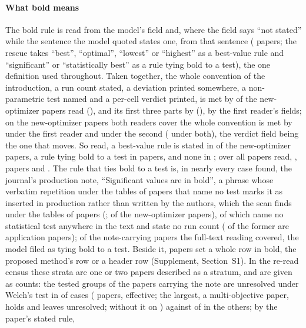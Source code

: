 \documentclass[preprint,review,12pt]{elsarticle}
\begin{document}
\paragraph{What bold means} The bold rule is read from the model's field and, where the field says ``not stated'' while the sentence the model quoted states one, from that sentence (\nTrSentenceRescued{} papers; the rescue takes ``best'', ``optimal'', ``lowest'' or ``highest'' as a best-value rule and ``significant'' or ``statistically best'' as a rule tying bold to a test), the one definition used throughout. Taken together, the whole convention of the introduction, a run count stated, a deviation printed somewhere, a non-parametric test named and a per-cell verdict printed, is met by \nTrNewOptimizerFullConvention{} of the \nTrNewOptimizerPapers{} new-optimizer papers read (\nTrNewOptimizerPctFullConvention{}), and its first three parts by \nTrNewOptimizerThreeOfFour{} (\nTrNewOptimizerPctThreeOfFour{}), by the first reader's fields; on the \nTaConventionNewOptimizerN{} new-optimizer papers both readers cover the whole convention is met by \nTaConventionNewOptimizerFirst{} under the first reader and \nTaConventionNewOptimizerSecond{} under the second (\nTaConventionNewOptimizerBoth{} under both), the verdict field being the one that moves. So read, a best-value rule is stated in \nTrNewOptimizerBoldBestPct{} of the new-optimizer papers, a rule tying bold to a test in \nTrNewOptimizerBoldStatisticallyBest{} papers, and none in \nTrNewOptimizerBoldNotStatedPct{}; over all \nTrAllPapers{} papers read, \nTrAllBoldBestPct{}, \nTrAllBoldStatisticallyBest{} papers and \nTrAllBoldNotStatedPct{}. The rule that ties bold to a test is, in nearly every case found, the journal's production note, ``Significant values are in bold'', a phrase whose verbatim repetition under the tables of papers that name no test marks it as inserted in production rather than written by the authors, which the scan finds under the tables of \nBnAllWithNote{} papers (\nBnAllPct{}; \nBnNewOptimizerPct{} of the new-optimizer papers), of which \nBnAllNoteNoTestNamed{} name no statistical test anywhere in the text and \nBnAllNoteNoRunsStated{} state no run count (\nBnApplicationNoteNoTestNamed{} of the former are application papers); of the \nTrNotePapersRead{} note-carrying papers the full-text reading covered, the model filed \nTrNoteFiledStatisticallyBest{} as tying bold to a test. Beside it, \nRbRowBoldPapers{} papers set a whole row in bold, the proposed method's row or a header row (Supplement, Section~S1). In the re-read census these strata are one or two papers described as a stratum, and are given as counts: the tested groups of the \nCrcNotePapers{} papers carrying the note are unresolved under Welch's test in \nCrcNoteWithFail{} of \nCrcNoteWithTested{} cases (\nCrcNoteWithTestedPapers{} papers, \nCrcNoteWithTestedEffective{} effective; the largest, a multi-objective paper, holds \nCrcNoteWithLargestTested{} and leaves \nCrcNoteWithLargestFail{} unresolved; without it \nCrcNoteWithWithoutLargestFail{} on \nCrcNoteWithWithoutLargestTested{}) against \nCrcNoteWithoutFail{} \nCrcNoteWithoutFailCi{} of \nCrcNoteWithoutTested{} in the others; by the paper's stated rule, \nCrcBoldBestFail{} 
\end{document}
